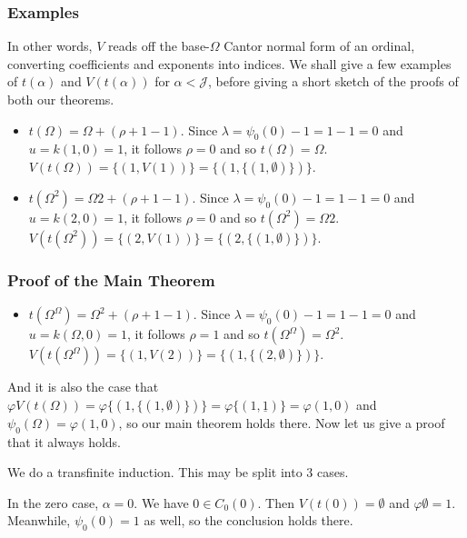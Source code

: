 \documentclass{beamer}
\begin{document}
\begin{frame}
\frametitle{Examples}
In other words, $V$ reads off the base-$\Omega$ Cantor normal form of an ordinal, converting coefficients and exponents into indices. We shall give a few examples of $t(\alpha)$ and $V(t(\alpha))$ for $\alpha < \mathcal{J}$, before giving a short sketch of the proofs of both our theorems.

\begin{itemize}
    \item $t(\Omega) = \Omega + (\rho + 1 - 1)$. \pause Since $\lambda = \psi_0(0) - 1 = 1 - 1 = 0$ and $u = k(1, 0) = 1$, it follows $\rho = 0$ and so $t(\Omega) = \Omega$. $V(t(\Omega)) = \{(1, V(1))\} = \{(1, \{(1, \emptyset)\})\}$.
    \item $t(\Omega^2) = \Omega 2 + (\rho + 1 - 1)$. \pause Since $\lambda = \psi_0(0) - 1 = 1 - 1 = 0$ and $u = k(2, 0) = 1$, it follows $\rho = 0$ and so $t(\Omega^2) = \Omega 2$. $V(t(\Omega^2)) = \{(2, V(1))\} = \{(2, \{(1, \emptyset)\})\}$.
\end{itemize}
\end{frame}

\begin{frame}
\frametitle{Proof of the Main Theorem}
\begin{itemize}
    \item $t(\Omega^\Omega) = \Omega^2 + (\rho + 1 - 1)$. \pause Since $\lambda = \psi_0(0) - 1 = 1 - 1 = 0$ and $u = k(\Omega, 0) = 1$, it follows $\rho = 1$ and so $t(\Omega^\Omega) = \Omega^2$. $V(t(\Omega^\Omega)) = \{(1, V(2))\} = \{(1, \{(2, \emptyset)\})\}$.
\end{itemize}

And it is also the case that $\varphi V(t(\Omega)) = \varphi \{(1, \{(1,\emptyset)\})\} = \varphi \{(1, \underline{1})\} = \varphi(1,0)$ and $\psi_0(\Omega) = \varphi(1,0)$, so our main theorem holds there. Now let us give a proof that it \alert{always} holds.

We do a transfinite induction. This may be split into 3 cases.

In the zero case, $\alpha = 0$. We have $0 \in C_0(0)$. Then $V(t(0)) = \emptyset$ and $\varphi \emptyset = 1$. Meanwhile, $\psi_0(0) = 1$ as well, so the conclusion holds there.
\end{frame}
\end{document}

